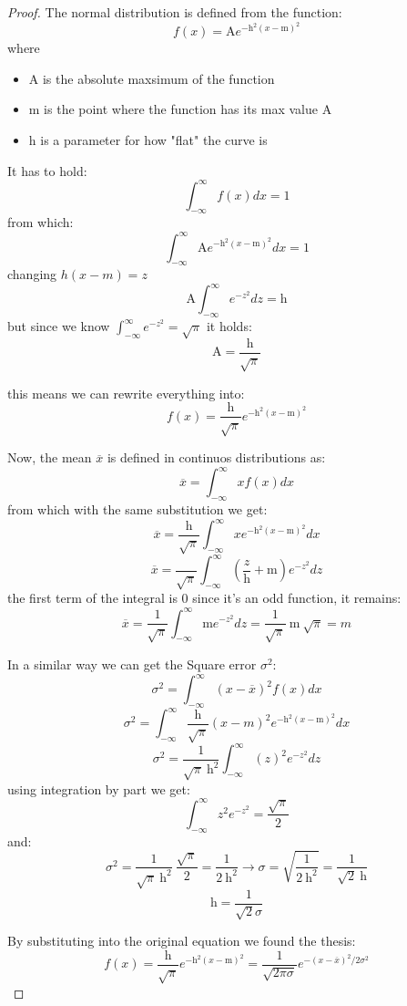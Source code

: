 \documentclass[11pt]{article}
\begin{document}
\begin{proof}
    The normal distribution is defined from the function:
    \[
        f(x) = \text{A} e^{-\text{h}^2(x-\text{m})^2}
    \]
    where
    \begin{itemize}
        \item A is the absolute maxsimum of the function
        \item m is the point where the function has its max value A
        \item h is a parameter for how "flat" the curve is
    \end{itemize}

    It has to hold:
    \[
        \int_{-\infty}^{\infty} f(x) dx = 1
    \]
    from which:
    \[
        \int_{-\infty}^{\infty} \text{A} e^{-\text{h}^2(x-\text{m})^2} dx = 1
    \]
    changing $h(x - m) = z$
    \[
        \text{A} \int_{-\infty}^{\infty} e^{-z^2} dz = \text{h}
    \]
    but since we know $\int_{-\infty}^{\infty} e^{-z^2} = \sqrt{\pi}$ it holds:
    \[
        \text{A} = \frac{\text{h}}{\sqrt{\pi}}
    \]

    this means we can rewrite everything into:
    \[
        f(x) = \frac{\text{h}}{\sqrt{\pi}} e^{-\text{h}^2(x-\text{m})^2}
    \]

    Now, the mean $\overline{x}$ is defined in continuos distributions as:
    \[
        \overline{x} = \int_{-\infty}^{\infty} x f(x) dx
    \]
    from which with the same substitution we get:
    \[
        \overline{x} = \frac{\text{h}}{\sqrt{\pi}} \int_{-\infty}^{\infty} x e^{-\text{h}^2(x-\text{m})^2} dx
    \]
    \[
        \overline{x} = \frac{}{\sqrt{\pi}} \int_{-\infty}^{\infty} (\frac{z}{\text{h}} + \text{m}) e^{-z^2} dz
    \]
    the first term of the integral is 0 since it's an odd function, it remains:
    \[
        \overline{x} = \frac{1}{\sqrt{\pi}} \int_{-\infty}^{\infty} \text{m} e^{-z^2} dz
                     = \frac{1}{\sqrt{\pi}} \ \text{m} \ \sqrt{\pi}
                     = m
    \]

    In a similar way we can get the Square error $\sigma^2$:
    \[
        \sigma^2 = \int_{-\infty}^{\infty} (x - \overline{x})^2 f(x) dx
    \]
    \[
        \sigma^2 = \int_{-\infty}^{\infty} \frac{\text{h}}{\sqrt{\pi}} (x - m)^2 e^{-\text{h}^2(x-\text{m})^2} dx
    \]
    \[
        \sigma^2 = \frac{1}{\sqrt{\pi} \ \text{h}^2} \int_{-\infty}^{\infty} (z)^2 e^{-z^2} dz
    \]
    using integration by part we get:
    \[
        \int_{-\infty}^{\infty} z^2 e^{-z^2} = \frac{\sqrt{\pi}}{2}
    \]
    and:
    \[
        \sigma^2
        =           \frac{1}{\sqrt{\pi} \ \text{h}^2} \ \frac{\sqrt{\pi}}{2}
        =           \frac{1}{2 \ \text{h}^2}
        \rightarrow \sigma
        =           \sqrt{\frac{1}{2 \ \text{h}^2}}
        =           \frac{1}{\sqrt{2} \ \text{h}}
    \]
    \[
        \text{h} = \frac{1}{\sqrt{2} \sigma}
    \]

    By substituting into the original equation we found the thesis:
    \[
        f(x) = \frac{\text{h}}{\sqrt{\pi}} e^{-\text{h}^2(x-\text{m})^2}
             = \frac{1}{\sqrt{2 \pi \sigma}} e^{-(x-\overline{x})^2 / 2\sigma^2}
    \]

\end{proof}
\end{document}
